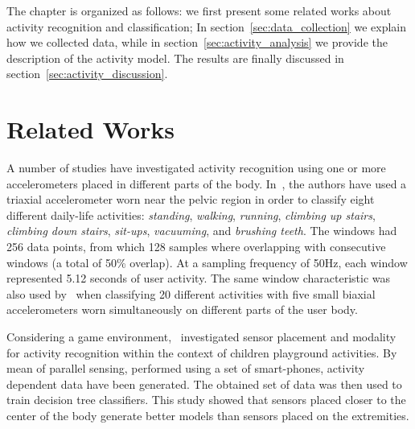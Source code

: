 The chapter is organized as follows: we first present some related works about activity recognition and classification; In section~\ref{sec:data_collection} we explain how we collected data, while in section~\ref{sec:activity_analysis} we provide the description of the activity model. The results are finally discussed in section~\ref{sec:activity_discussion}.

\section{Related Works}\label{sec:act_related_works}


A number of studies have investigated activity recognition using one or more accelerometers placed in different parts of the body. In~\cite{ravi_activity_2005}, the authors have used a triaxial accelerometer worn near the pelvic region in order to classify eight different daily-life activities: \textit{standing}, \textit{walking}, \textit{running}, \textit{climbing up stairs}, \textit{climbing down stairs}, \textit{sit-ups}, \textit{vacuuming}, and \textit{brushing teeth}. The windows had 256 data points, from which 128 samples where overlapping with consecutive windows (a total of 50\% overlap). At a sampling frequency of 50Hz, each window represented 5.12 seconds of user activity. The same window characteristic was also used by~\cite{bao_activity_2004} when classifying 20 different activities with five small biaxial accelerometers worn simultaneously on different parts of the user body.

Considering a game environment,~\cite{jablonsky_evaluating_2017} investigated sensor placement and modality for activity recognition within the context of children playground  activities. By mean of parallel sensing, performed using a set of smart-phones, activity dependent data have been generated. The obtained set of data was then used to train decision tree classifiers. This study showed that sensors placed closer to the center of the body generate better models than sensors placed on the extremities. 

